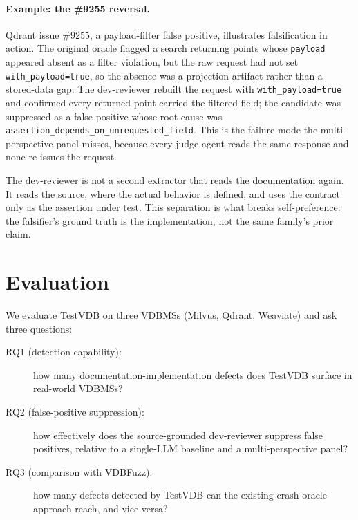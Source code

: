 \documentclass[sigconf]{acmart}
\begin{document}
\paragraph{Example: the \#9255 reversal.}
Qdrant issue \#9255, a payload-filter false positive, illustrates falsification in action. The original oracle flagged a search returning points whose \texttt{payload} appeared absent as a filter violation, but the raw request had not set \texttt{with\_payload=true}, so the absence was a projection artifact rather than a stored-data gap. The dev-reviewer rebuilt the request with \texttt{with\_payload=true} and confirmed every returned point carried the filtered field; the candidate was suppressed as a false positive whose root cause was \texttt{assertion\_depends\_on\_unrequested\_field}. This is the failure mode the multi-perspective panel misses, because every judge agent reads the same response and none re-issues the request.

The dev-reviewer is not a second extractor that reads the documentation again. It reads the source, where the actual behavior is defined, and uses the contract only as the assertion under test. This separation is what breaks self-preference: the falsifier's ground truth is the implementation, not the same family's prior claim.
\section{Evaluation}
\label{sec:eval}

We evaluate TestVDB on three VDBMSs (Milvus, Qdrant, Weaviate) and ask three questions:
\begin{description}
  \item[RQ1 (detection capability):] how many documentation-implementation defects does TestVDB surface in real-world VDBMSs?
  \item[RQ2 (false-positive suppression):] how effectively does the source-grounded dev-reviewer suppress false positives, relative to a single-LLM baseline and a multi-perspective panel?
  \item[RQ3 (comparison with VDBFuzz):] how many defects detected by TestVDB can the existing crash-oracle approach reach, and vice versa?
\end{description}
\end{document}
